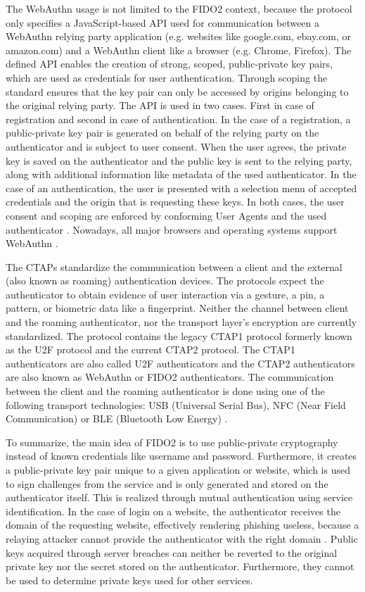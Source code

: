 \documentclass[runningheads]{llncs}
\begin{document}
The WebAuthn usage is not limited to the FIDO2 context, because the protocol only specifies a JavaScript-based API used for communication between a WebAuthn relying party application (e.g. websites like google.com, ebay.com, or amazon.com) and a WebAuthn client like a browser (e.g. Chrome, Firefox). The defined API enables the creation of strong, scoped, public-private key pairs, which are used as credentials for user authentication. Through scoping the standard ensures that the key pair can only be accessed by origins belonging to the original relying party. The API is used in two cases. First in case of registration and second in case of authentication. In the case of a registration, a public-private key pair is generated  on behalf of the relying party on the authenticator and is subject to user consent. When the user agrees, the private key is saved on the authenticator and the public key is sent to the relying party, along with additional information like metadata of the used authenticator. In the case of an authentication, the user is presented with a selection menu of accepted credentials and the origin that is requesting these keys. In both cases, the user consent and scoping are enforced by conforming User Agents and the used authenticator \cite{000002}. Nowadays, all major browsers and operating systems support WebAuthn \cite{000001}.

The CTAPs standardize the communication between a client and the external (also known as roaming) authentication devices. The protocols expect the authenticator to obtain evidence of user interaction via a gesture, a pin, a pattern, or biometric data like a fingerprint. Neither the channel between client and the roaming authenticator, nor the transport layer's encryption are currently standardized. The protocol contains the legacy CTAP1 protocol formerly known as the U2F protocol and the current CTAP2 protocol. The CTAP1 authenticators are also called U2F authenticators and the CTAP2 authenticators are also known as WebAuthn or FIDO2 authenticators. The communication between the client and the roaming authenticator is done using one of the following transport technologies: USB (Universal Serial Bus), NFC (Near Field Communication) or BLE (Bluetooth Low Energy) \cite{000003}\cite{274547}\cite{9099190}.

To summarize, the main idea of FIDO2 is to use public-private cryptography instead of known credentials like username and password. Furthermore, it creates a public-private key pair unique to a given application or website, which is used to sign challenges from the service and is only generated and stored on the authenticator itself. This is realized through mutual authentication using service identification. In the case of login on a website, the authenticator receives the domain of the requesting website, effectively rendering phishing useless, because a relaying attacker cannot provide the authenticator with the right domain \cite{274610}. Public keys acquired through server breaches can neither be reverted to the original private key nor the secret stored on the authenticator. Furthermore, they cannot be used to determine private keys used for other services.
\end{document}
